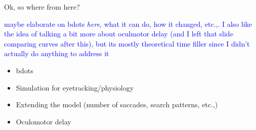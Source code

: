 \documentclass{beamer}
\providecommand{\cn}[1]{\textcolor{blue}{#1}}
\begin{document}
\begin{frame}{Ok, so where from here?}

\cn{maybe elaborate on bdots \textit{here}, what it can do, how it changed, etc.,. I also like the idea of talking a bit more about oculmotor delay (and I left that slide comparing curves after this), but its mostly theoretical time filler since I didn't actually do anything to address it}

\begin{itemize}
\item bdots
\item Simulation for eyetracking/physiology
\item Extending the model (number of saccades, search patterns, etc.,)
\item Oculomotor delay
\end{itemize}
\end{frame}
%
%
%
%
%
%
%
\end{document}

